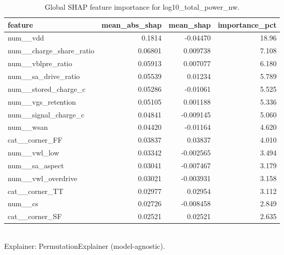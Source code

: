 \begin{table}[!t]
\centering
\caption{Global SHAP feature importance for log10_total_power_nw.}
\label{tab:xai_shap_importance_log10_total_power_nw}
\footnotesize
\begin{tabular}{lrrr}
\toprule
feature & mean\_abs\_shap & mean\_shap & importance\_pct \\
\midrule
num\_\_vdd & 0.1814 & -0.04470 & 18.96 \\
num\_\_charge\_share\_ratio & 0.06801 & 0.009738 & 7.108 \\
num\_\_vblpre\_ratio & 0.05913 & 0.007077 & 6.180 \\
num\_\_sa\_drive\_ratio & 0.05539 & 0.01234 & 5.789 \\
num\_\_stored\_charge\_c & 0.05286 & -0.01061 & 5.525 \\
num\_\_vgs\_retention & 0.05105 & 0.001188 & 5.336 \\
num\_\_signal\_charge\_c & 0.04841 & -0.009145 & 5.060 \\
num\_\_wsan & 0.04420 & -0.01164 & 4.620 \\
cat\_\_corner\_FF & 0.03837 & 0.03837 & 4.010 \\
num\_\_vwl\_low & 0.03342 & -0.002565 & 3.494 \\
num\_\_sa\_aspect & 0.03041 & -0.007467 & 3.179 \\
num\_\_vwl\_overdrive & 0.03021 & -0.003931 & 3.158 \\
cat\_\_corner\_TT & 0.02977 & 0.02954 & 3.112 \\
num\_\_cs & 0.02726 & -0.008458 & 2.849 \\
cat\_\_corner\_SF & 0.02521 & 0.02521 & 2.635 \\
\bottomrule
\end{tabular}
\\[2pt] \footnotesize Explainer: PermutationExplainer (model-agnostic).
\end{table}
